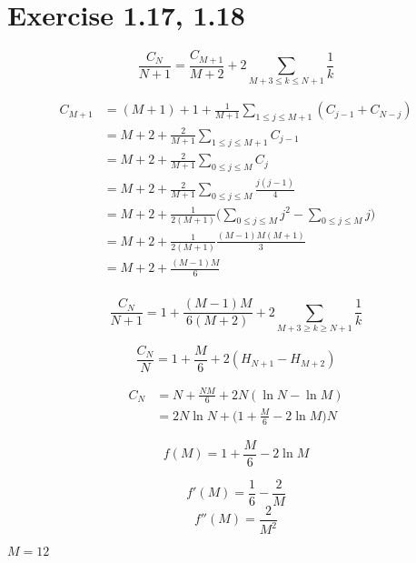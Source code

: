 \documentclass{book}
\begin{document}
\section*{Exercise 1.17, 1.18}


$$\frac{C_{N}}{N+1} = \frac{C_{M+1}}{M+2} + 2 \sum_{M+3 \le k \le N+1}\frac{1}{k}$$

\begin{align*}
  C_{M+1} &= (M+1) + 1 + \frac{1}{M+1} \sum_{1 \le j \le M+1} (C_{j-1} + C_{N-j}) \\
          &= M+2+\frac{2}{M+1}\sum_{1 \le j \le M+1} C_{j-1} \\
          &= M+2+\frac{2}{M+1}\sum_{0 \le j \le M} C_{j} \\
          &= M+2+\frac{2}{M+1}\sum_{0 \le j \le M} \frac{j(j-1)}{4} \\
          &= M+2+\frac{1}{2(M+1)}\Big(\sum_{0 \le j \le M} j^2 - \sum_{0 \le j \le M} j\Big) \\
          &= M+2+\frac{1}{2(M+1)} \frac{(M-1)M(M+1)}{3} \\
          &= M+2+\frac{(M-1)M}{6} \\
\end{align*}


$$\frac{C_{N}}{N+1} = 1 + \frac{{(M-1)M}}{6(M+2)} +  2 \sum_{M+3 \ge k \ge N+1}\frac{1}{k}$$

$$\frac{C_{N}}{N}= 1 + \frac{M}{6} + 2 (H_{N+1} - H_{M+2})$$

\begin{align*}
  C_{N} &= N + \frac{NM}{6} + 2N(\ln{N} - \ln{M}) \\
   &= 2N\ln{N} + \Big( 1 + \frac{M}{6} - 2\ln{M}\Big)N
\end{align*}

$$ f(M) = 1 + \frac{M}{6} - 2\ln{M}$$

$$ f'(M) = \frac{1}{6} - \frac{2}{M}$$
$$ f''(M) = \frac{2}{M^2}$$

$M = 12$
\end{document}
